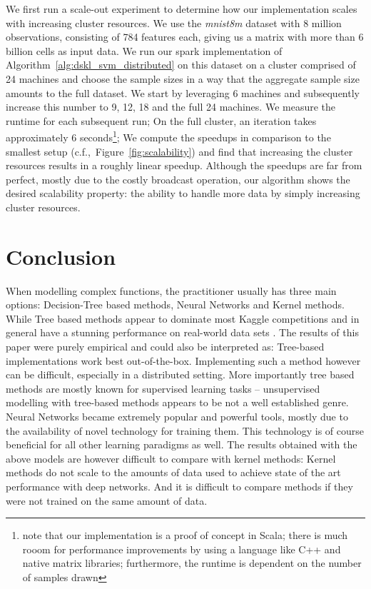 \documentclass{article} %
\begin{document}
We first run a scale-out experiment to determine how our implementation scales with increasing cluster resources. We use the \textit{mnist8m} dataset with 8 million observations, consisting of 784 features each, giving us a matrix with more than $6$ billion cells as input data. We run our spark implementation of Algorithm~\ref{alg:dskl_svm_distributed} on this dataset on a cluster comprised of 24 machines and choose the sample sizes in a way that the aggregate sample size amounts to the full dataset. We start by leveraging 6 machines and subsequently increase this number to 9, 12, 18 and the full 24 machines. We measure the runtime for each subsequent run; On the full cluster, an iteration takes approximately 6 seconds\footnote{note that our implementation is a proof of concept in Scala; there is much rooom for performance improvements by using a language like C++ and native matrix libraries; furthermore, the runtime is dependent on the number of samples drawn}; We compute the speedups in comparison to the smallest setup (c.f.,~Figure~\ref{fig:scalability}) and find that increasing the cluster resources results in a roughly linear speedup. Although the speedups are far from perfect, mostly due to the costly broadcast operation, our algorithm shows the desired scalability property: the ability to handle more data by simply increasing cluster resources.

\section{Conclusion}
When modelling complex functions, the practitioner usually has three main options: Decision-Tree based methods, Neural Networks and Kernel methods. While Tree based methods appear to dominate most Kaggle competitions and in general have a stunning performance on real-world data sets \cite{Caruana2006}. The results of this paper were purely empirical and could also be interpreted as: Tree-based implementations work best out-of-the-box. Implementing such a method however can be difficult, especially in a distributed setting. More importantly tree based methods are mostly known for supervised learning tasks -- unsupervised modelling with tree-based methods appears to be not a well established genre. Neural Networks became extremely popular and powerful tools, mostly due to the availability of novel technology for training them. This technology is of course beneficial for all other learning paradigms as well. The results obtained with the above models are however difficult to compare with kernel methods: Kernel methods do not scale to the amounts of data used to achieve state of the art performance with deep networks. And it is difficult to compare methods if they were not trained on the same amount of data.
\end{document}
